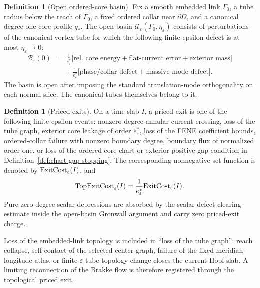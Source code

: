 \documentclass[11pt]{article}
\theoremstyle{definition}
\newtheorem{definition}[theorem]{Definition}
\newcommand{\eps}{\varepsilon}
\newcommand{\estar}{e_\varepsilon^\ast}
\newcommand{\Basin}{\mathcal B}
\begin{document}
\begin{definition}[Open ordered-core basin]
\label{def:short-open-basin}
Fix a smooth embedded link \(\Gamma_0\), a tube radius below the reach of
\(\Gamma_0\), a fixed ordered collar near \(\partial\Omega\), and a canonical
degree-one core profile \(q_\ast\).  The open basin
\(\mathcal U_\eps(\Gamma_0,\eta_\eps)\) consists of perturbations of the
canonical vortex tube for which the following finite-epsilon defect is at most
\(\eta_\eps\to0\):
\[
\begin{aligned}
        \Basin_\eps(0)
        &=
        \frac{1}{\estar}\bigl[
        \text{rel. core energy}
        +\text{flat-current error}
        +\text{exterior mass}
        \bigr]
\\
        &\quad+
        \frac{1}{\estar}\bigl[
        \text{phase/collar defect}
        +\text{massive-mode defect}
        \bigr].
\end{aligned}
\]
The basin is open after imposing the standard translation-mode orthogonality
on each normal slice.  The canonical tubes themselves belong to it.
\end{definition}

\begin{definition}[Priced exits]
\label{def:short-priced-exit}
On a time slab \(I\), a priced exit is one of the following finite-epsilon
events:
nonzero-degree annular current crossing, loss of the tube graph, exterior core
leakage of order \(\estar\), loss of the FENE coefficient bounds, ordered-collar
failure with nonzero boundary degree, boundary flux of normalized order one, or
loss of the ordered-core chart or exterior positive-gap condition in
Definition~\ref{def:chart-gap-stopping}.  The corresponding nonnegative set
function is
denoted by \({\rm ExitCost}_\eps(I)\), and
\[
        {\rm TopExitCost}_\eps(I)
        =
        \frac{1}{\estar}{\rm ExitCost}_\eps(I).
\]
Pure zero-degree scalar depressions are absorbed by the scalar-defect clearing
estimate inside the open-basin Gronwall argument and carry zero priced-exit
charge.
\end{definition}

Loss of the embedded-link topology is included in ``loss of the tube graph'':
reach collapse, self-contact of the selected center graph, failure of the fixed
meridian-longitude atlas, or finite-\(\eps\) tube-topology change closes the
current Hopf slab.  A limiting reconnection of the Brakke flow is therefore
registered through the topological priced exit.
\end{document}
